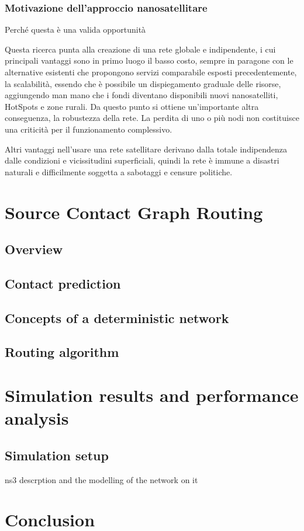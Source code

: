 \documentclass[a4paper]{article}
\begin{document}
			\subsubsection{Motivazione dell'approccio nanosatellitare}
			{\sc Perché questa è una valida opportunità}

			Questa ricerca punta alla creazione di una rete globale e indipendente, i cui principali vantaggi sono in primo luogo il basso costo, sempre in paragone con le alternative esistenti che propongono servizi comparabile esposti precedentemente, la scalabilità, essendo che è possibile un dispiegamento graduale delle risorse, aggiungendo man mano che i fondi diventano disponibili nuovi nanosatelliti, HotSpots e zone rurali. Da questo punto si ottiene un'importante altra conseguenza, la robustezza della rete. La perdita di uno o più nodi non costituisce una criticità per il funzionamento complessivo. 
			
			Altri vantaggi nell'usare una rete satellitare derivano dalla totale indipendenza dalle condizioni e vicissitudini superficiali, quindi la rete è immune a disastri naturali e difficilmente soggetta a sabotaggi e censure politiche.
			
		
		
	\section{Source Contact Graph Routing}
	
		\subsection{Overview}
		
		\subsection{Contact prediction}
		
		\subsection{Concepts of a deterministic network}
		
		\subsection{Routing algorithm}
		
	\section{Simulation results and performance analysis}
		
			\subsection{Simulation setup}
			ns3 descrption and the modelling of the network on it
	
	\section{Conclusion}
	
\end{document}

